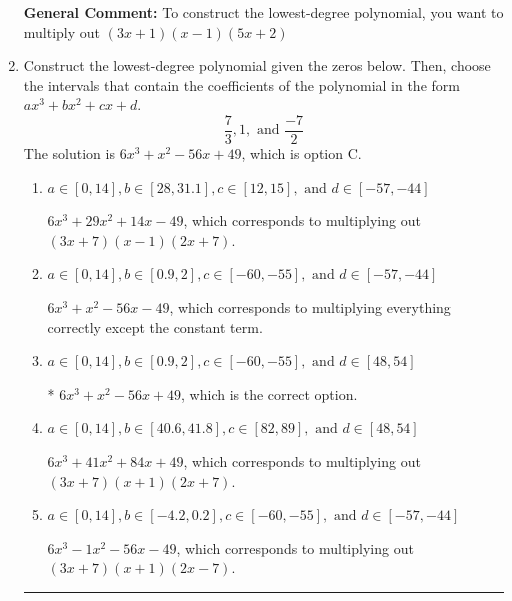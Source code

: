\documentclass{extbook}[14pt]
\newcommand{\litem}[1]{\item #1

\rule{\textwidth}{0.4pt}}
\begin{document}
\begin{enumerate}
{\textbf{General Comment:} To construct the lowest-degree polynomial, you want to multiply out $(3x + 1)(x -1)(5x + 2)$
}
\litem{
Construct the lowest-degree polynomial given the zeros below. Then, choose the intervals that contain the coefficients of the polynomial in the form $ax^3+bx^2+cx+d$.
\[ \frac{7}{3}, 1, \text{ and } \frac{-7}{2} \]The solution is \( 6x^{3} + x^{2} -56 x + 49 \), which is option C.\begin{enumerate}[label=\Alph*.]
\item \( a \in [0, 14], b \in [28, 31.1], c \in [12, 15], \text{ and } d \in [-57, -44] \)

$6x^{3} +29 x^{2} +14 x -49$, which corresponds to multiplying out $(3x + 7)(x -1)(2x + 7)$.
\item \( a \in [0, 14], b \in [0.9, 2], c \in [-60, -55], \text{ and } d \in [-57, -44] \)

$6x^{3} + x^{2} -56 x -49$, which corresponds to multiplying everything correctly except the constant term.
\item \( a \in [0, 14], b \in [0.9, 2], c \in [-60, -55], \text{ and } d \in [48, 54] \)

* $6x^{3} + x^{2} -56 x + 49$, which is the correct option.
\item \( a \in [0, 14], b \in [40.6, 41.8], c \in [82, 89], \text{ and } d \in [48, 54] \)

$6x^{3} +41 x^{2} +84 x + 49$, which corresponds to multiplying out $(3x + 7)(x + 1)(2x + 7)$.
\item \( a \in [0, 14], b \in [-4.2, 0.2], c \in [-60, -55], \text{ and } d \in [-57, -44] \)

$6x^{3} -1 x^{2} -56 x -49$, which corresponds to multiplying out $(3x + 7)(x + 1)(2x -7)$.
\end{enumerate}

}
\end{enumerate}
\end{document}
